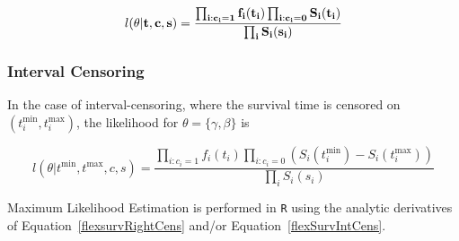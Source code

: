 \begin{equation}
    \label{flexsurvRightCens}
    l(\bf{\theta}|t,c,s) = \frac{\prod_{i:c_i=1} f_i(t_i) \prod_{i:c_i=0} S_i(t_i)}{\prod_{i} S_i(s_i)}
\end{equation}

\subsubsection{Interval Censoring}
In the case of interval-censoring, where the survival time is censored on $(t_i^{\text{min}}, t_i^{\text{max}})$, the likelihood for $\theta = \{\gamma, \beta\}$ is 

\begin{equation}
    \label{flexSurvIntCens}
    l(\theta|t^\text{min}, t^\text{max}, c,s) = \frac{\prod_{i:c_i=1} f_i(t_i) \prod_{i:c_i=0} \left(S_i(t_i^{\text{min}}) - S_i(t_i^{\text{max}}) \right)}{\prod_{i} S_i(s_i)}
\end{equation}

Maximum Likelihood Estimation is performed in \verb|R| using the analytic derivatives of Equation~\ref{flexsurvRightCens} and/or Equation~\ref{flexSurvIntCens}. 
